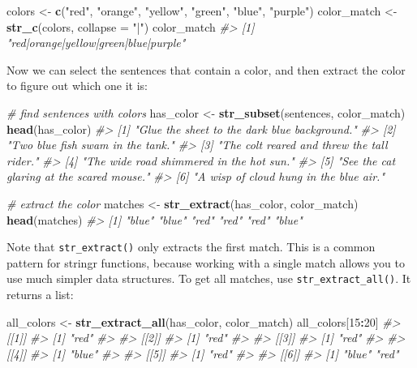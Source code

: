 \documentclass[]{book}
\newenvironment{Shaded}{\begin{snugshade}}{\end{snugshade}}
\newcommand{\CommentTok}[1]{\textcolor[rgb]{0.56,0.35,0.01}{\textit{#1}}}
\newcommand{\DataTypeTok}[1]{\textcolor[rgb]{0.13,0.29,0.53}{#1}}
\newcommand{\DecValTok}[1]{\textcolor[rgb]{0.00,0.00,0.81}{#1}}
\newcommand{\KeywordTok}[1]{\textcolor[rgb]{0.13,0.29,0.53}{\textbf{#1}}}
\newcommand{\NormalTok}[1]{#1}
\newcommand{\OperatorTok}[1]{\textcolor[rgb]{0.81,0.36,0.00}{\textbf{#1}}}
\newcommand{\StringTok}[1]{\textcolor[rgb]{0.31,0.60,0.02}{#1}}
\begin{document}
\begin{Shaded}
\begin{Highlighting}[]
\NormalTok{colors <-}\StringTok{ }\KeywordTok{c}\NormalTok{(}\StringTok{"red"}\NormalTok{, }\StringTok{"orange"}\NormalTok{, }\StringTok{"yellow"}\NormalTok{, }\StringTok{"green"}\NormalTok{, }\StringTok{"blue"}\NormalTok{, }\StringTok{"purple"}\NormalTok{)}
\NormalTok{color_match <-}\StringTok{ }\KeywordTok{str_c}\NormalTok{(colors, }\DataTypeTok{collapse =} \StringTok{"|"}\NormalTok{)}
\NormalTok{color_match}
\CommentTok{#> [1] "red|orange|yellow|green|blue|purple"}
\end{Highlighting}
\end{Shaded}

Now we can select the sentences that contain a color, and then extract the color to figure out which one it is:

\begin{Shaded}
\begin{Highlighting}[]
\CommentTok{# find sentences with colors}
\NormalTok{has_color <-}\StringTok{ }\KeywordTok{str_subset}\NormalTok{(sentences, color_match)}
\KeywordTok{head}\NormalTok{(has_color)}
\CommentTok{#> [1] "Glue the sheet to the dark blue background."}
\CommentTok{#> [2] "Two blue fish swam in the tank."            }
\CommentTok{#> [3] "The colt reared and threw the tall rider."  }
\CommentTok{#> [4] "The wide road shimmered in the hot sun."    }
\CommentTok{#> [5] "See the cat glaring at the scared mouse."   }
\CommentTok{#> [6] "A wisp of cloud hung in the blue air."}

\CommentTok{# extract the color}
\NormalTok{matches <-}\StringTok{ }\KeywordTok{str_extract}\NormalTok{(has_color, color_match)}
\KeywordTok{head}\NormalTok{(matches)}
\CommentTok{#> [1] "blue" "blue" "red"  "red"  "red"  "blue"}
\end{Highlighting}
\end{Shaded}

Note that \texttt{str\_extract()} only extracts the first match. This is a common pattern for stringr functions, because working with a single match allows you to use much simpler data structures. To get all matches, use \texttt{str\_extract\_all()}. It returns a list:

\begin{Shaded}
\begin{Highlighting}[]
\NormalTok{all_colors <-}\StringTok{ }\KeywordTok{str_extract_all}\NormalTok{(has_color, color_match)}
\NormalTok{all_colors[}\DecValTok{15}\OperatorTok{:}\DecValTok{20}\NormalTok{]}
\CommentTok{#> [[1]]}
\CommentTok{#> [1] "red"}
\CommentTok{#> }
\CommentTok{#> [[2]]}
\CommentTok{#> [1] "red"}
\CommentTok{#> }
\CommentTok{#> [[3]]}
\CommentTok{#> [1] "red"}
\CommentTok{#> }
\CommentTok{#> [[4]]}
\CommentTok{#> [1] "blue"}
\CommentTok{#> }
\CommentTok{#> [[5]]}
\CommentTok{#> [1] "red"}
\CommentTok{#> }
\CommentTok{#> [[6]]}
\CommentTok{#> [1] "blue" "red"}
\end{Highlighting}
\end{Shaded}
\end{document}
